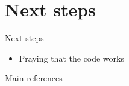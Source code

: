 \section{Next steps}
\begin{frame}{Next steps}

    \begin{itemize}
        \item Praying that the code works
    \end{itemize}




\end{frame}




\begin{frame}{Main references}
    \nocite{colombiLearningBlockStructured2022a}
    \nocite{mohammadiBayesianStructureLearning2015a}
    \nocite{legramantiExtendedStochasticBlock2022}
    \nocite{bensonAdaptiveMCMCMultiple2018}
    \nocite{martinezNonparametricChangePoint2014}
    
    
    \printbibliography
    \renewcommand*{\bibfont}{\small}
\end{frame}




